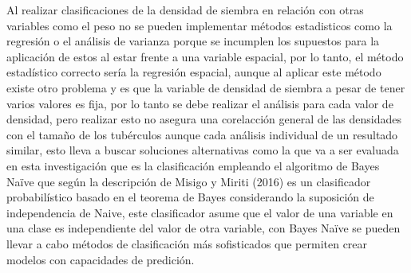 Al realizar clasificaciones de la densidad de siembra en relación con otras variables como el peso no se pueden implementar métodos estadisticos como la regresión o el análisis de varianza porque se incumplen los supuestos para la aplicación de estos al estar frente a una variable espacial, por lo tanto, el método estadístico correcto sería la regresión espacial, aunque al aplicar este método existe otro problema y es que la variable de densidad de siembra a pesar de tener varios valores es fija, por lo tanto se debe realizar el análisis para cada valor de densidad, pero realizar esto no asegura una corelacción general de las densidades con el tamaño de los tubérculos aunque cada análisis individual de un resultado similar, esto lleva a buscar soluciones alternativas como la que va a ser evaluada en esta investigación que es la clasificación empleando el algoritmo de Bayes Naïve que según la descripción de Misigo y Miriti (2016) es un clasificador probabilístico basado en el teorema de Bayes considerando la suposición de independencia de Naive, este clasificador asume que el valor de una variable en una clase es independiente del valor de otra variable, con Bayes Naïve se pueden llevar a cabo métodos de clasificación más sofisticados que permiten crear modelos con capacidades de predición.
